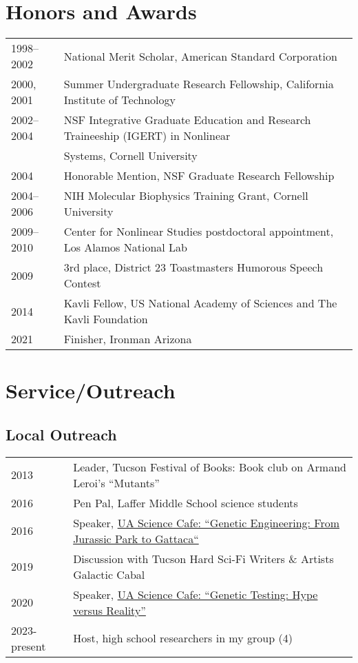 \documentclass[11pt]{article}
\begin{document}
\section*{Honors and Awards}
\begin{longtable}[l]{l l}
1998--2002 & National Merit Scholar, American Standard Corporation\\
2000, 2001      & Summer Undergraduate Research Fellowship, California Institute of Technology\\
2002--2004 & NSF Integrative Graduate Education and Research Traineeship (IGERT) in Nonlinear\\
                  & Systems, Cornell University\\
2004      & Honorable Mention, NSF Graduate Research Fellowship\\
2004--2006 & NIH Molecular Biophysics Training Grant, Cornell University\\
2009--2010 & Center for Nonlinear Studies postdoctoral appointment, Los Alamos National Lab\\
2009 & 3rd place, District 23 Toastmasters Humorous Speech Contest\\
2014 & Kavli Fellow, US National Academy of Sciences and The Kavli Foundation\\
2021 & Finisher, Ironman Arizona\\ %
\end{longtable}

\section*{Service/Outreach}
\subsection*{Local Outreach}
\begin{longtable}[l]{l l}
2013 & Leader, Tucson Festival of Books: Book club on Armand Leroi's ``Mutants''\\
2016 & Pen Pal, Laffer Middle School science students\\
2016 & Speaker, \href{https://www.youtube.com/watch?v=0s-kFTu24dg}{UA Science Cafe: ``Genetic Engineering: From Jurassic Park to Gattaca``}\\
2019 & Discussion with Tucson Hard Sci-Fi Writers \& Artists Galactic Cabal\\
2020 & Speaker, \href{https://www.youtube.com/watch?v=je5GcyU6CYc}{UA Science Cafe: ``Genetic Testing: Hype versus Reality''}\\
2023-present & Host, high school researchers in my group (4) %
\end{longtable}
\end{document}
